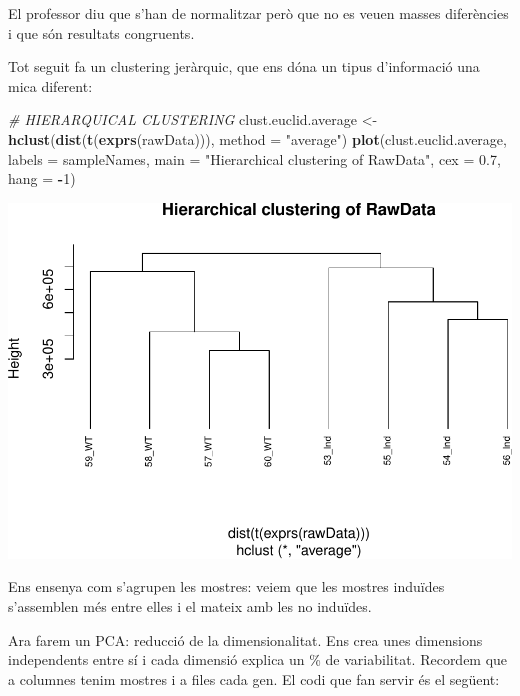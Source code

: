 \documentclass[
]{article}
\newenvironment{Shaded}{\begin{snugshade}}{\end{snugshade}}
\newcommand{\AttributeTok}[1]{\textcolor[rgb]{0.13,0.29,0.53}{#1}}
\newcommand{\CommentTok}[1]{\textcolor[rgb]{0.56,0.35,0.01}{\textit{#1}}}
\newcommand{\DecValTok}[1]{\textcolor[rgb]{0.00,0.00,0.81}{#1}}
\newcommand{\FloatTok}[1]{\textcolor[rgb]{0.00,0.00,0.81}{#1}}
\newcommand{\FunctionTok}[1]{\textcolor[rgb]{0.13,0.29,0.53}{\textbf{#1}}}
\newcommand{\NormalTok}[1]{#1}
\newcommand{\OtherTok}[1]{\textcolor[rgb]{0.56,0.35,0.01}{#1}}
\newcommand{\SpecialCharTok}[1]{\textcolor[rgb]{0.81,0.36,0.00}{\textbf{#1}}}
\newcommand{\StringTok}[1]{\textcolor[rgb]{0.31,0.60,0.02}{#1}}
\begin{document}
El professor diu que s'han de normalitzar però que no es veuen masses
diferències i que són resultats congruents.

Tot seguit fa un clustering jeràrquic, que ens dóna un tipus
d'informació una mica diferent:

\begin{Shaded}
\begin{Highlighting}[]
\CommentTok{\# HIERARQUICAL CLUSTERING}
\NormalTok{clust.euclid.average }\OtherTok{\textless{}{-}} \FunctionTok{hclust}\NormalTok{(}\FunctionTok{dist}\NormalTok{(}\FunctionTok{t}\NormalTok{(}\FunctionTok{exprs}\NormalTok{(rawData))), }\AttributeTok{method =} \StringTok{"average"}\NormalTok{)}
\FunctionTok{plot}\NormalTok{(clust.euclid.average, }\AttributeTok{labels =}\NormalTok{ sampleNames, }\AttributeTok{main =} \StringTok{"Hierarchical clustering of RawData"}\NormalTok{,}
    \AttributeTok{cex =} \FloatTok{0.7}\NormalTok{, }\AttributeTok{hang =} \SpecialCharTok{{-}}\DecValTok{1}\NormalTok{)}
\end{Highlighting}
\end{Shaded}

\includegraphics{APUNTS_files/figure-latex/graficosCalidad2-1.pdf}

Ens ensenya com s'agrupen les mostres: veiem que les mostres induïdes
s'assemblen més entre elles i el mateix amb les no induïdes.

Ara farem un PCA: reducció de la dimensionalitat. Ens crea unes
dimensions independents entre sí i cada dimensió explica un \% de
variabilitat. Recordem que a columnes tenim mostres i a files cada gen.
El codi que fan servir és el següent:
\end{document}
